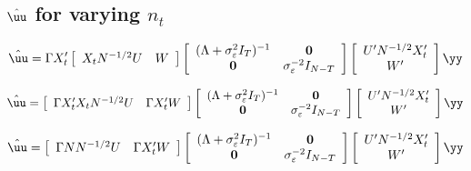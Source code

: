 \subsection{$\hat{\uu}$ for varying $n_t$}

\begin{equation}
    \label{u_hat_var_n_initial}
    \hat{\uu} = \Gamma 
    X_t'
    \left[\begin{array}{cc}
    X_t N^{-1/2}U & W 
\end{array}\right]
\left[ 
\begin{array}{cc}
    (\Lambda + \sigma_\varepsilon^2I_T)^{-1} & \mathbf{0} \\
    \mathbf{0} & \sigma_\varepsilon^{-2}I_{N-T}
\end{array}
\right]
\left[ 
\begin{array}{c}
     U' N^{-1/2} X_t'  \\
      W'
\end{array}\right]\yy
\end{equation}

\begin{equation}
    \hat{\uu} = 
    \left[\begin{array}{cc}
    \Gamma 
    X_t'X_t N^{-1/2}U & \Gamma 
    X_t'W 
\end{array}\right]
\left[ 
\begin{array}{cc}
    (\Lambda + \sigma_\varepsilon^2I_T)^{-1} & \mathbf{0} \\
    \mathbf{0} & \sigma_\varepsilon^{-2}I_{N-T}
\end{array}
\right]
\left[ 
\begin{array}{c}
     U' N^{-1/2} X_t'  \\
      W'
\end{array}\right]\yy
\end{equation}

\begin{equation}
    \hat{\uu} = 
    \left[\begin{array}{cc}
    \Gamma 
    N N^{-1/2}U & \Gamma 
    X_t'W 
\end{array}\right]
\left[ 
\begin{array}{cc}
    (\Lambda + \sigma_\varepsilon^2I_T)^{-1} & \mathbf{0} \\
    \mathbf{0} & \sigma_\varepsilon^{-2}I_{N-T}
\end{array}
\right]
\left[ 
\begin{array}{c}
     U' N^{-1/2} X_t'  \\
      W'
\end{array}\right]\yy
\end{equation}

